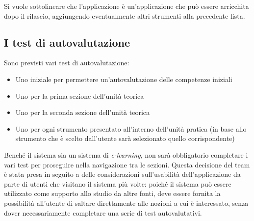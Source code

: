 Si vuole sottolineare che l'applicazione \ProjectTitle{} è un'applicazione che può essere arricchita dopo il rilascio, aggiungendo eventualmente altri strumenti alla precedente lista.

\subsection{I test di autovalutazione}
Sono previsti vari test di autovalutazione:
\begin{itemize}
	\item Uno iniziale per permettere un'autovalutazione delle competenze iniziali
	\item Uno per la prima sezione dell'unità teorica
	\item Uno per la seconda sezione dell'unità teorica
	\item Uno per ogni strumento presentato all'interno dell'unità pratica (in base allo strumento che è scelto dall'utente sarà selezionato quello corrispondente)
\end{itemize}
Benché il sistema sia un sistema di \emph{e-learning}, non sarà obbligatorio completare i vari test per proseguire nella navigazione tra le sezioni. Questa decisione del team è stata presa in seguito a delle considerazioni sull'usabilità dell'applicazione da parte di utenti che visitano il sistema più volte: poiché il sistema può essere utilizzato come supporto allo studio da altre fonti, deve essere fornita la possibilità all'utente di saltare direttamente alle nozioni a cui è interessato, senza dover necessariamente completare una serie di test autovalutativi.